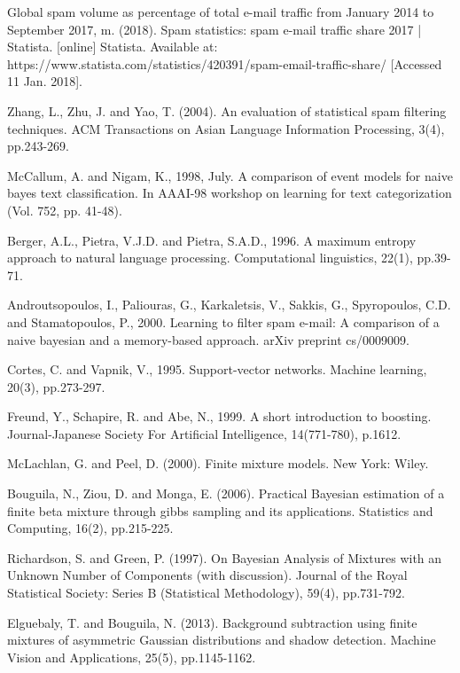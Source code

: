 \documentclass[conference]{IEEEtran}
\begin{document}
\begin{thebibliography}{[MT1]}
 Global spam volume as percentage of total e-mail traffic from January 2014 to September 2017, m. (2018). Spam statistics: spam e-mail traffic share 2017 | Statista. [online] Statista. Available at: https://www.statista.com/statistics/420391/spam-email-traffic-share/ [Accessed 11 Jan. 2018].

 Zhang, L., Zhu, J. and Yao, T. (2004). An evaluation of statistical spam filtering techniques. ACM Transactions on Asian Language Information Processing, 3(4), pp.243-269.

 McCallum, A. and Nigam, K., 1998, July. A comparison of event models for naive bayes text classification. In AAAI-98 workshop on learning for text categorization (Vol. 752, pp. 41-48).

 Berger, A.L., Pietra, V.J.D. and Pietra, S.A.D., 1996. A maximum entropy approach to natural language processing. Computational linguistics, 22(1), pp.39-71.

 Androutsopoulos, I., Paliouras, G., Karkaletsis, V., Sakkis, G., Spyropoulos, C.D. and Stamatopoulos, P., 2000. Learning to filter spam e-mail: A comparison of a naive bayesian and a memory-based approach. arXiv preprint cs/0009009.

 Cortes, C. and Vapnik, V., 1995. Support-vector networks. Machine learning, 20(3), pp.273-297.

 Freund, Y., Schapire, R. and Abe, N., 1999. A short introduction to boosting. Journal-Japanese Society For Artificial Intelligence, 14(771-780), p.1612.

 McLachlan, G. and Peel, D. (2000). Finite mixture models. New York: Wiley.

 Bouguila, N., Ziou, D. and Monga, E. (2006). Practical Bayesian estimation of a finite beta mixture through gibbs sampling and its applications. Statistics and Computing, 16(2), pp.215-225.

 Richardson, S. and Green, P. (1997). On Bayesian Analysis of Mixtures with an Unknown Number of Components (with discussion). Journal of the Royal Statistical Society: Series B (Statistical Methodology), 59(4), pp.731-792.

 Elguebaly, T. and Bouguila, N. (2013). Background subtraction using finite mixtures of asymmetric Gaussian distributions and shadow detection. Machine Vision and Applications, 25(5), pp.1145-1162.


\end{thebibliography}
\end{document}
